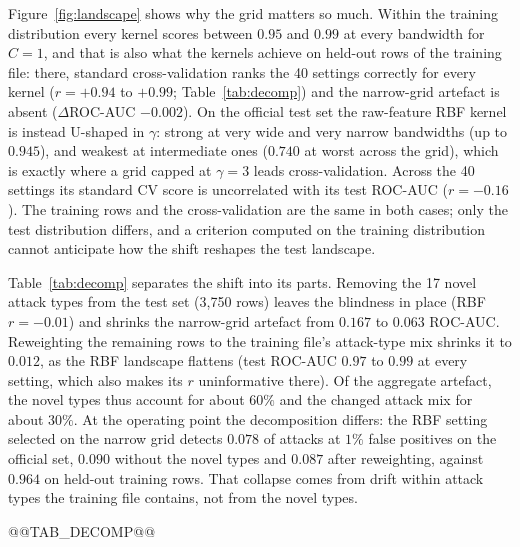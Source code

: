 Figure~\ref{fig:landscape} shows why the grid matters so much. Within the training distribution every
kernel scores between $0.95$ and $0.99$ at every bandwidth for $C=1$, and that is also what the kernels
achieve on held-out rows of the training file: there, standard cross-validation ranks the 40 settings
correctly for every kernel ($r=+0.94$ to $+0.99$; Table~\ref{tab:decomp}) and the narrow-grid artefact is
absent ($\Delta$ROC-AUC $-0.002$). On the official test set the raw-feature RBF kernel is instead U-shaped
in $\gamma$: strong at very wide and very narrow bandwidths (up to $0.945$), and weakest at intermediate
ones ($0.740$ at worst across the grid), which is exactly where a grid capped at $\gamma=3$ leads
cross-validation. Across the 40 settings its standard CV score is uncorrelated with its test ROC-AUC
($r=-0.16$). The training rows and the cross-validation are the same in both cases; only the test
distribution differs, and a criterion computed on the training distribution cannot anticipate how the
shift reshapes the test landscape.

Table~\ref{tab:decomp} separates the shift into its parts. Removing the 17 novel attack types from the
test set (3{,}750 rows) leaves the blindness in place (RBF $r=-0.01$) and shrinks the narrow-grid
artefact from $0.167$ to $0.063$ ROC-AUC. Reweighting the remaining rows to the training file's
attack-type mix shrinks it to $0.012$, as the RBF landscape flattens (test ROC-AUC $0.97$ to $0.99$ at
every setting, which also makes its $r$ uninformative there). Of the aggregate artefact, the novel types
thus account for about $60\%$ and the changed attack mix for about $30\%$. At the operating point the
decomposition differs: the RBF setting selected on the narrow grid detects $0.078$ of attacks at $1\%$
false positives on the official set, $0.090$ without the novel types and $0.087$ after reweighting,
against $0.964$ on held-out training rows. That collapse comes from drift within attack types the
training file contains, not from the novel types.

@@TAB_DECOMP@@
